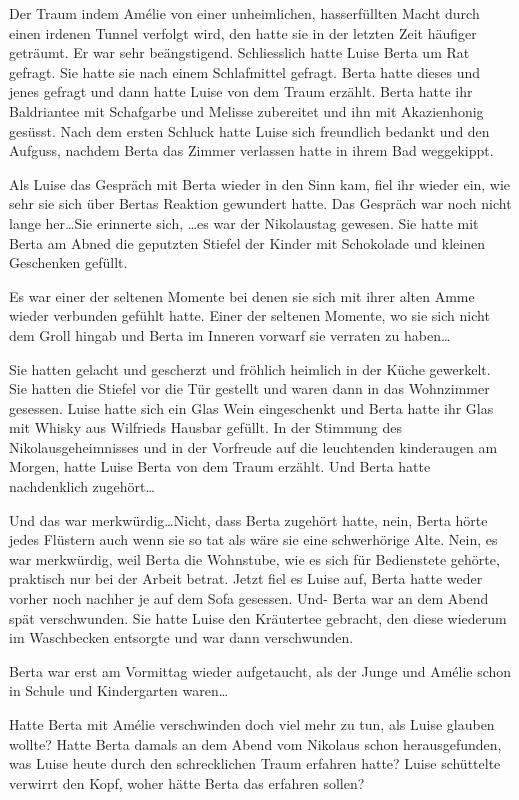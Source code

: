 \documentclass[11pt,titlepage,a5paper]{book}
\newcommand{\am}{Amélie }
\begin{document}
Der Traum indem \am von einer unheimlichen, hasserfüllten Macht durch einen irdenen Tunnel verfolgt wird, den hatte sie in der letzten Zeit häufiger geträumt. Er war sehr beängstigend. Schliesslich hatte Luise Berta um Rat gefragt. Sie hatte sie nach einem Schlafmittel gefragt. Berta hatte dieses und jenes gefragt und dann hatte Luise von dem Traum erzählt. Berta hatte ihr Baldriantee mit Schafgarbe und Melisse  zubereitet und ihn mit Akazienhonig gesüsst. Nach dem ersten Schluck hatte Luise sich freundlich bedankt und den Aufguss, nachdem Berta das Zimmer verlassen hatte in ihrem Bad weggekippt.

Als Luise das Gespräch mit Berta wieder in den Sinn kam, fiel ihr wieder ein, wie sehr sie sich über Bertas Reaktion gewundert hatte. Das Gespräch war noch nicht lange her\dots Sie erinnerte sich, \dots es war der Nikolaustag gewesen. Sie hatte mit Berta am Abned die geputzten Stiefel der Kinder mit Schokolade und kleinen Geschenken gefüllt. 

Es war einer der seltenen Momente bei denen sie sich mit ihrer alten Amme wieder verbunden gefühlt hatte. Einer der seltenen Momente, wo sie sich nicht dem Groll hingab und Berta im Inneren vorwarf sie verraten zu haben\dots

Sie hatten gelacht und gescherzt und fröhlich heimlich in der Küche gewerkelt. Sie hatten die Stiefel vor die Tür gestellt und waren dann in das Wohnzimmer gesessen. Luise hatte sich ein Glas Wein eingeschenkt und Berta hatte ihr Glas mit Whisky aus Wilfrieds Hausbar gefüllt. In der Stimmung des Nikolausgeheimnisses und in der Vorfreude auf die leuchtenden kinderaugen am Morgen, hatte Luise Berta von dem Traum erzählt. Und Berta hatte nachdenklich zugehört\dots 

Und das war merkwürdig\dots Nicht, dass Berta zugehört hatte, nein, Berta hörte jedes Flüstern auch wenn sie so tat als wäre sie eine schwerhörige Alte. Nein, es war merkwürdig, weil Berta die Wohnstube, wie es sich für Bedienstete gehörte, praktisch nur bei der Arbeit betrat. Jetzt fiel es Luise auf, Berta hatte weder vorher noch nachher je auf dem Sofa gesessen. Und- Berta war an dem Abend spät verschwunden. Sie hatte Luise den Kräutertee gebracht, den diese wiederum im Waschbecken entsorgte und war dann verschwunden.

Berta war erst am Vormittag wieder aufgetaucht, als der Junge und \am schon in Schule und Kindergarten waren\dots

Hatte Berta mit \am verschwinden doch viel mehr zu tun, als Luise glauben wollte? Hatte Berta damals an dem Abend vom Nikolaus schon herausgefunden, was Luise heute durch den schrecklichen Traum erfahren hatte? Luise schüttelte verwirrt den Kopf, woher hätte Berta das erfahren sollen?
\end{document}
